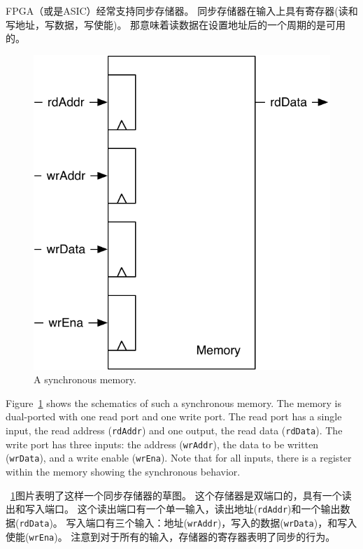 \documentclass[%
    10pt,
    headinclude, footexclude,
    openright, %
    notitlepage,
    cleardoubleempty,
    headsepline,
    pointlessnumbers,
    bibtotoc, idxtotoc,
    ]{scrbook}
\newcommand{\code}[1]{{\small{\texttt{#1}}}}
\newcommand{\scale}{0.7}
\begin{document}
FPGA（或是ASIC）经常支持同步存储器。
同步存储器在输入上具有寄存器(读和写地址，写数据，写使能)。
那意味着读数据在设置地址后的一个周期的是可用的。

\begin{figure}
  \centering
  \includegraphics[scale=\scale]{figures/memory}
  \caption{A synchronous memory.}
  \label{fig:memory}
\end{figure}

Figure~\ref{fig:memory} shows the schematics of such a synchronous memory.
The memory is dual-ported with one read port and one write port.
The read port has a single input, the read address (\code{rdAddr}) and
one output, the read data (\code{rdData}).
The write port has three inputs: the address (\code{wrAddr}), the data
to be written (\code{wrData}), and a write enable (\code{wrEna}).
Note that for all inputs, there is a register within the memory showing the
synchronous behavior.

~\ref{fig:memory}图片表明了这样一个同步存储器的草图。
这个存储器是双端口的，具有一个读出和写入端口。
这个读出端口有一个单一输入，读出地址(\code{rdAddr})和一个输出数据(\code{rdData})。
写入端口有三个输入：地址(\code{wrAddr})，写入的数据(\code{wrData})，和写入使能(\code{wrEna})。
注意到对于所有的输入，存储器的寄存器表明了同步的行为。
\end{document}
